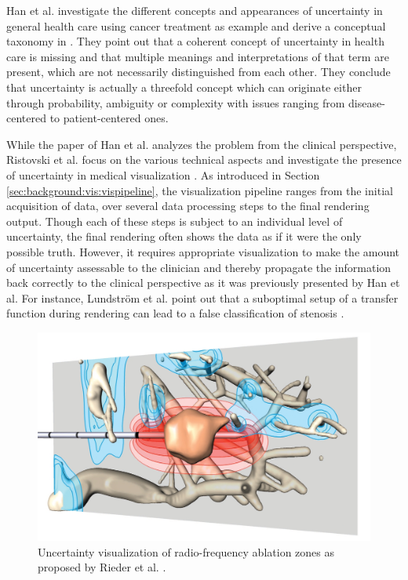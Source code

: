 Han et al. investigate the different concepts and appearances of uncertainty in general health care using cancer treatment as example and derive a conceptual taxonomy in \cite{Han:2011:UncertaintyInHealthCare}.
They point out that a coherent concept of uncertainty in health care is missing and that multiple meanings and interpretations of that term are present, which are not necessarily distinguished from each other.
They conclude that uncertainty is actually a threefold concept which can originate either through probability, ambiguity or complexity with issues ranging from disease-centered to patient-centered ones.

While the paper of Han et al. analyzes the problem from the clinical perspective, Ristovski et al. focus on the various technical aspects and investigate the presence of uncertainty in medical visualization \cite{Ristovski:2014:UncertaintyInMedVis}.
As introduced in Section \ref{sec:background:vis:vispipeline}, the visualization pipeline ranges from the initial acquisition of data, over several data processing steps to the final rendering output.
Though each of these steps is subject to an individual level of uncertainty, the final rendering often shows the data as if it were the only possible truth.
However, it requires appropriate visualization to make the amount of uncertainty assessable to the clinician and thereby propagate the information back correctly to the clinical perspective as it was previously presented by Han et al.
For instance, Lundström et al. point out that a suboptimal setup of a transfer function during rendering can lead to a false classification of stenosis \cite{Lundstrom:2007:Animation}.

\begin{figure}[ht]
	\centering
	\includegraphics[width=0.75\linewidth]{figures/cmvis/rieder-rfablation.jpg}
	\caption{
		Uncertainty visualization of radio-frequency ablation zones as proposed by Rieder et al. \cite{Rieder:2011:AblationApproximation}.
	}
	\label{fig:cmvis:rieder-rfablation}
\end{figure}

